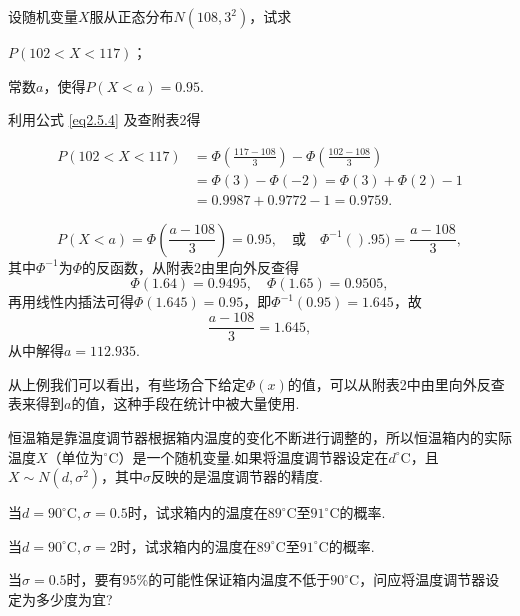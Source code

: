 \begin{example}
  设随机变量$X$服从正态分布$N(108,3^2)$，试求

  \begin{inparaenum}[(1)]
    \item $P(102<X<117)$；

    \item 常数$a$，使得$P(X<a)=0.95$.
  \end{inparaenum}
\end{example}
\begin{solution}
  利用公式 \eqref{eq2.5.4} 及查附表2得

  \begin{inparaenum}[(1)]
    \item
    \begin{align*}
      P( 102 < X < 117 ) & = \varPhi\left(\frac{117-108}3\right) -
      \varPhi\left( \frac{102-108}3 \right) \\
      & = \varPhi(3) - \varPhi(-2) = \varPhi(3) + \varPhi(2) - 1 \\
      & = 0.9987 + 0.9772 - 1 = 0.9759.
    \end{align*}

    \item
    \[
      P(X < a) = \varPhi\left( \frac{a-108}3 \right) = 0.95, \quad \text{或}\quad
      \varPhi^{-1}().95) = \frac{a-108}3,
    \]
    其中$\varPhi^{-1}$为$\varPhi$的反函数，从附表2由里向外反查得
    \[
      \varPhi(1.64) = 0.9495,\quad \varPhi(1.65) = 0.9505,
    \]
    再用线性内插法可得$\varPhi(1.645)=0.95$，即$\varPhi^{-1}(0.95)=1.645$，故
    \[
      \frac{a - 108}3 = 1.645,
    \]
    从中解得$a=112.935$.
  \end{inparaenum}
\end{solution}

从上例我们可以看出，有些场合下给定$\varPhi(x)$的值，可以从附表2中由里向外反查表来得到$a$的值，这种手段在统计中被大量使用.

\begin{example}
  恒温箱是靠温度调节器根据箱内温度的变化不断进行调整的，所以恒温箱内的实际温度$X$（单位为$^\circ\mathrm C$）是一个随机变量.如果将温度调节器设定在$d^\circ\mathrm C$，且$X\sim N(d,\sigma^2)$，其中$\sigma$反映的是温度调节器的精度.

  \begin{inparaenum}[(1)]
    \item 当$d=90^\circ\mathrm C,\sigma=0.5$时，试求箱内的温度在$89^\circ\mathrm C$至$91^\circ\mathrm C$的概率.

    \item 当$d=90^\circ\mathrm C,\sigma=2$时，试求箱内的温度在$89^\circ\mathrm C$至$91^\circ\mathrm C$的概率.

    \item 当$\sigma=0.5$时，要有95\%的可能性保证箱内温度不低于$90^\circ\mathrm C$，问应将温度调节器设定为多少度为宜?
  \end{inparaenum}
\end{example}

